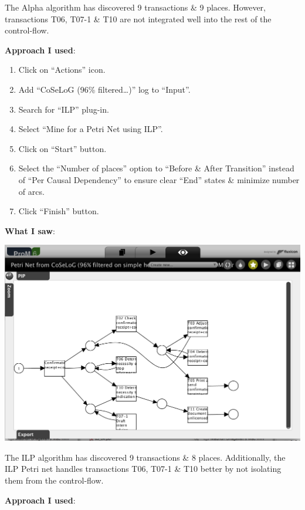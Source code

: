 \documentclass[]{article}
\begin{document}
The Alpha algorithm has discovered 9 transactions \& 9 places. However,
transactions T06, T07-1 \& T10 are not integrated well into the rest of
the control-flow.

\textbf{Approach I used}:

\begin{enumerate}
\def\labelenumi{\arabic{enumi}.}
\setcounter{enumi}{22}
\itemsep1pt\parskip0pt
\item
  Click on ``Actions'' icon.\\
\item
  Add ``CoSeLoG (96\% filtered\ldots{})'' log to ``Input''.\\
\item
  Search for ``ILP'' plug-in.\\
\item
  Select ``Mine for a Petri Net using ILP''.
\item
  Click on ``Start'' button.
\item
  Select the ``Number of places'' option to ``Before \& After
  Transition'' instead of ``Per Causal Dependency'' to ensure clear
  ``End'' states \& minimize number of arcs.
\item
  Click ``Finish'' button.
\end{enumerate}

\textbf{What I saw}:

\includegraphics{CoSeLoG_Step_05_Filter96_PetriNet_ILP.png}

The ILP algorithm has discovered 9 transactions \& 8 places.
Additionally, the ILP Petri net handles transactions T06, T07-1 \& T10
better by not isolating them from the control-flow.

\textbf{Approach I used}:
\end{document}
